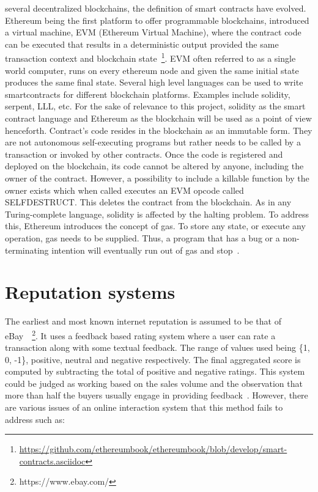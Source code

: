 several decentralized blockchains, the definition of smart contracts have
evolved. Ethereum being the first platform to offer programmable blockchains,
introduced a virtual machine, EVM (Ethereum Virtual Machine), where the
contract code can be executed that results in a deterministic output provided
the same transaction context and blockchain
state~\footnote{\url{https://github.com/ethereumbook/ethereumbook/blob/develop/smart-contracts.asciidoc}}.
EVM often referred to as a single world computer, runs on every ethereum node
and given the same initial state produces the same final state. Several high
level languages can be used to write smartcontracts for different blockchain
platforms. Examples include solidity, serpent, LLL, etc.  For the sake of
relevance to this project, solidity as the smart contract language and Ethereum
as the blockchain will be used as a point of view henceforth. Contract's code
resides in the blockchain as an immutable form.  They are not autonomous
self-executing programs but rather needs to be called by a transaction or
invoked by other contracts. Once the code is registered and deployed on the
blockchain, its code cannot be altered by anyone, including the owner of the
contract. However, a possibility to include a killable function by the owner
exists which when called executes an EVM opcode called SELFDESTRUCT. This
deletes the contract from the blockchain. As in any Turing-complete language,
solidity is affected by the halting problem.  To address this, Ethereum
introduces the concept of gas. To store any state, or execute any operation,
gas needs to be supplied. Thus, a program that has a bug or a non-terminating
intention will eventually run out of gas and stop~\cite{whataresmartcontracts}.

\section{Reputation systems}
The earliest and most known internet reputation is assumed to be that of
eBay~\cite{resnick2002trust}~\footnote{https://www.ebay.com/}. It uses a
feedback based rating system where a user can rate a transaction along with
some textual feedback. The range of values used being \{1, 0, -1\}, positive,
neutral and negative respectively. The final aggregated score is computed by
subtracting the total of positive and negative ratings. This system could be
judged as working based on the sales volume and the observation that more than
half the buyers usually engage in providing feedback~\cite{resnick2006value}.
However, there are various issues of an online interaction system that this
method fails to address such as: 
